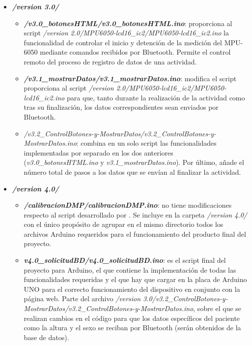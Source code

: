 \begin{itemize}
\begin{itemize}
\begin{itemize}
        \end{itemize}
        \item \textbf{\textit{/version 3.0/}}
        \begin{itemize}
            \item \textbf{\textit{/v3.0\_botonesHTML/v3.0\_botonesHTML.ino}}: proporciona al script \textit{/version 2.0/MPU6050-lcd16\_ic2/MPU6050-lcd16\_ic2.ino} la funcionalidad de controlar el inicio y detención de la medición del MPU-6050 mediante comandos recibidos por Bluetooth. Permite el control remoto del proceso de registro de datos de una actividad.
            \item \textbf{\textit{/v3.1\_mostrarDatos/v3.1\_mostrarDatos.ino}}: modifica el script proporciona al script \textit{/version 2.0/MPU6050-lcd16\_ic2/MPU6050-lcd16\_ic2.ino} para que, tanto durante la realización de la actividad como tras su finalización, los datos correspondientes sean enviados por Bluetooth.
            \item \textit{/v3.2\_ControlBotones-y-MostrarDatos/v3.2\_ControlBotones-y-MostrarDatos.ino}: combina en un solo script las funcionalidades implementadas por separado en los dos anteriores (\textit{v3.0\_botonesHTML.ino} y \textit{v3.1\_mostrarDatos.ino}). Por último, añade el número total de pasos a los datos que se envían al finalizar la actividad.
        \end{itemize}
        \item \textbf{\textit{/version 4.0/}}
        \begin{itemize}
            \item \textbf{\textit{/calibracionDMP/calibracionDMP.ino}}: no tiene modificaciones respecto al script desarrollado por \cite{saragonz91:online}. Se incluye en la carpeta \textit{/version 4.0/} con el único propósito de agrupar en el mismo directorio todos los archivos Arduino requeridos para el funcionamiento del producto final del proyecto.
            \item \textbf{\textit{v4.0\_solicitudBD/v4.0\_solicitudBD.ino}}: es el script final del proyecto para Arduino, el que contiene la implementación de todas las funcionalidades requeridas y el que hay que cargar en la placa de Arduino UNO para el correcto funcionamiento del dispositivo en conjunto con la página web. Parte del archivo \textit{/version 3.0/v3.2\_ControlBotones-y-MostrarDatos/v3.2\_ControlBotones-y-MostrarDatos.ino}, sobre el que se realizan cambios en el código para que los datos específicos del paciente como la altura y el sexo se reciban por Bluetooth (serán obtenidos de la base de datos).
        \end{itemize}
        

\end{itemize}
\end{itemize}
